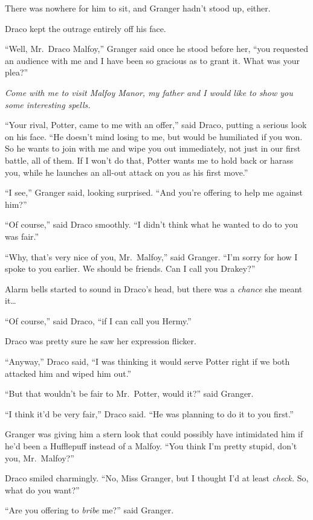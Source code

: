 There was nowhere for him to sit, and Granger hadn't stood up, either.

Draco kept the outrage entirely off his face.

``Well, Mr.~Draco Malfoy,'' Granger said once he stood before her, ``you
requested an audience with me and I have been so gracious as to grant
it. What was your plea?''

\emph{Come with me to visit Malfoy Manor, my father and I would like to
show you some interesting spells.}

``Your rival, Potter, came to me with an offer,'' said Draco, putting a
serious look on his face. ``He doesn't mind losing to me, but would be
humiliated if you won. So he wants to join with me and wipe you out
immediately, not just in our first battle, all of them. If I won't do
that, Potter wants me to hold back or harass you, while he launches an
all-out attack on you as his first move.''

``I see,'' Granger said, looking surprised. ``And you're offering to
help me against him?''

``Of course,'' said Draco smoothly. ``I didn't think what he wanted to
do to you was fair.''

``Why, that's very nice of you, Mr.~Malfoy,'' said Granger. ``I'm sorry
for how I spoke to you earlier. We should be friends. Can I call you
Drakey?''

Alarm bells started to sound in Draco's head, but there was a
\emph{chance} she meant it\ldots{}

``Of course,'' said Draco, ``if I can call you Hermy.''

Draco was pretty sure he saw her expression flicker.

``Anyway,'' Draco said, ``I was thinking it would serve Potter right if
we both attacked him and wiped him out.''

``But that wouldn't be fair to Mr.~Potter, would it?'' said Granger.

``I think it'd be very fair,'' Draco said. ``He was planning to do it to
you first.''

Granger was giving him a stern look that could possibly have intimidated
him if he'd been a Hufflepuff instead of a Malfoy. ``You think I'm
pretty stupid, don't you, Mr.~Malfoy?''

Draco smiled charmingly. ``No, Miss Granger, but I thought I'd at least
\emph{check.} So, what do you want?''

``Are you offering to \emph{bribe} me?'' said Granger.

